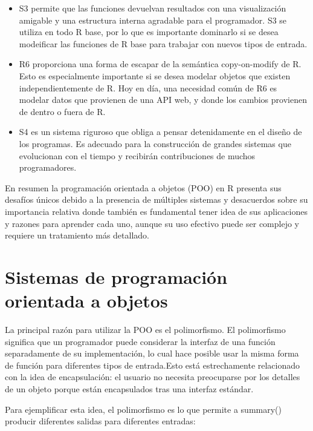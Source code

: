 \documentclass[
]{book}
\begin{document}
\begin{itemize}
\item
  S3 permite que las funciones devuelvan resultados con una visualización amigable y una estructura interna agradable para el programador. S3 se utiliza en todo R base, por lo que es importante dominarlo si se desea modeificar las funciones de R base para trabajar con nuevos tipos de entrada.
\item
  R6 proporciona una forma de escapar de la semántica copy-on-modify de R. Esto es especialmente importante si se desea modelar objetos que existen independientemente de R. Hoy en día, una necesidad común de R6 es modelar datos que provienen de una API web, y donde los cambios provienen de dentro o fuera de R.
\item
  S4 es un sistema riguroso que obliga a pensar detenidamente en el diseño de los programas. Es adecuado para la construcción de grandes sistemas que evolucionan con el tiempo y recibirán contribuciones de muchos programadores.
\end{itemize}

En resumen la programación orientada a objetos (POO) en R presenta sus desafíos únicos debido a la presencia de múltiples sistemas y desacuerdos sobre su importancia relativa donde también es fundamental tener idea de sus aplicaciones y razones para aprender cada uno, aunque su uso efectivo puede ser complejo y requiere un tratamiento más detallado.

\hypertarget{sistemas-de-programaciuxf3n-orientada-a-objetos}{%
\section{Sistemas de programación orientada a objetos}\label{sistemas-de-programaciuxf3n-orientada-a-objetos}}

La principal razón para utilizar la POO es el polimorfismo. El polimorfismo significa que un programador puede considerar la interfaz de una función separadamente de su implementación, lo cual hace posible usar la misma forma de función para diferentes tipos de entrada.Esto está estrechamente relacionado con la idea de encapsulación: el usuario no necesita preocuparse por los detalles de un objeto porque están encapsulados tras una interfaz estándar.

Para ejemplificar esta idea, el polimorfismo es lo que permite a summary() producir diferentes salidas para diferentes entradas:
\end{document}
